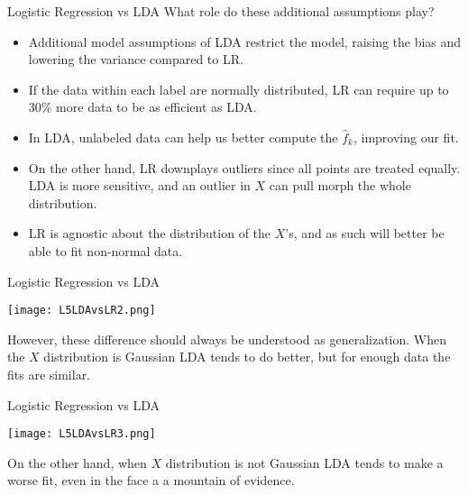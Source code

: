 \documentclass[10pt, table, dvipsnames,xcdraw, handout]{beamer}
\begin{document}
\begin{frame}[fragile]{Logistic Regression vs LDA}
What role do these additional assumptions play?

\begin{itemize}
\item Additional model assumptions of LDA restrict the model, raising the bias and lowering the variance compared to LR.\pause
\item If the data within each label are normally distributed, LR can require up to 30\% more data to be as efficient as LDA.\pause
\item In LDA, unlabeled data can help us better compute the $\hat{f}_k$, improving our fit. \pause
\item On the other hand, LR downplays outliers since all points are treated equally. LDA is more sensitive, and an outlier in $X$ can pull morph the whole distribution. \pause
\item LR is agnostic about the distribution of the $X$'s, and as such will better be able to fit non-normal data. 
\end{itemize}
\end{frame}





\begin{frame}[fragile]{Logistic Regression vs LDA}
  \begin{minipage}[t][0.5\textheight][t]{\textwidth}
	\centering \texttt{[image: L5LDAvsLR2.png]} 
  \end{minipage}
  \vfill
\begin{minipage}[t][0.5\textheight][t]{\textwidth}
However, these difference should always be understood as generalization. When the $X$ distribution is Gaussian LDA tends to do better, but for enough data the fits are similar.  
\end{minipage}
\end{frame}


\begin{frame}[fragile]{Logistic Regression vs LDA}
  \begin{minipage}[t][0.5\textheight][t]{\textwidth}
	\centering \texttt{[image: L5LDAvsLR3.png]} 
  \end{minipage}
  \vfill
\begin{minipage}[t][0.5\textheight][t]{\textwidth}
On the other hand, when $X$ distribution is not Gaussian LDA tends to make a worse fit, even in the face a a mountain of evidence. 
\end{minipage}
\end{frame}
\end{document}
